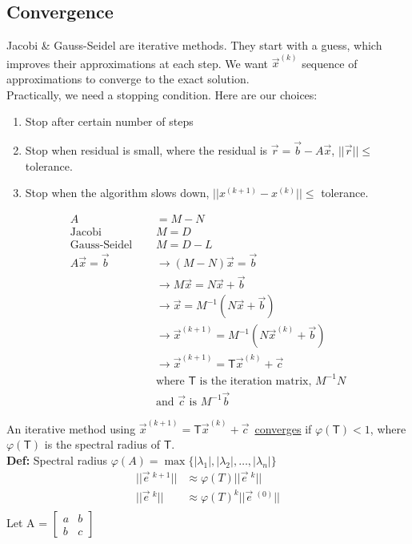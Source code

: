 \documentclass[12pt, letterpaper]{article}
\begin{document}
\subsection{Convergence}
Jacobi \& Gauss-Seidel are iterative methods. They start with a guess, which improves their approximations at each step. We want $\vec x^{(k)}$ 
sequence of approximations to converge to the exact solution. \\

\noindent Practically, we need a stopping condition. Here are our choices:
\begin{enumerate}
    \item Stop after certain number of steps
    \item Stop when residual is small, where the residual is $\vec r = \vec b - A\vec x$, $||\vec r|| \le$ tolerance.
    \item Stop when the algorithm slows down, $||x^{(k+1)}-x^{(k)}||\le $ tolerance.
\end{enumerate}
\begin{align*}
    A&=M-N \\ 
    \text{Jacobi }\quad& M = D \\
    \text{Gauss-Seidel }\quad& M = D - L \\
    A\vec x = \vec b &\rightarrow (M-N)\vec x = \vec b \\
    &\rightarrow M\vec x =N\vec x +\vec b \\
    &\rightarrow \vec x = M^{-1} (N\vec x +\vec b) \\
    &\rightarrow \vec x^{(k+1)}=M^{-1}(N\vec x^{(k)}+\vec b) \\
    &\rightarrow \vec x^{(k+1)}=\mathsf{T} \vec x^{(k)}+\vec c \\
    &\text{where } \mathsf{T} \text{ is the iteration matrix, } M^{-1}N \\
    &\text{and } \vec c \text{ is } M^{-1} \vec b
\end{align*}

\noindent An iterative method using  $\vec x ^{(k+1)} = \mathsf{T} \vec x ^{(k)} +\vec c$\ \underline{converges} if $\varphi(\mathsf{T})<1$, 
where $\varphi (\mathsf T)$ is the spectral radius of $\mathsf T$. \\

\noindent \textbf{Def: } Spectral radius $\varphi(A)=\max \{ |\lambda_1|,|\lambda_2|,\ldots,|\lambda_n|\}$ 
\begin{align*}
    ||\vec e\ ^{k+1}|| &\approx \varphi(T) ||\vec e\ ^{k}|| \\
    ||\vec e\ ^{k}|| &\approx \varphi(T)^k ||\vec e\ ^{(0)}|| \\
\end{align*}
Let A =
    $\begin{bmatrix}
        a & b \\
        b & c
    \end{bmatrix}$ \\
\end{document}

